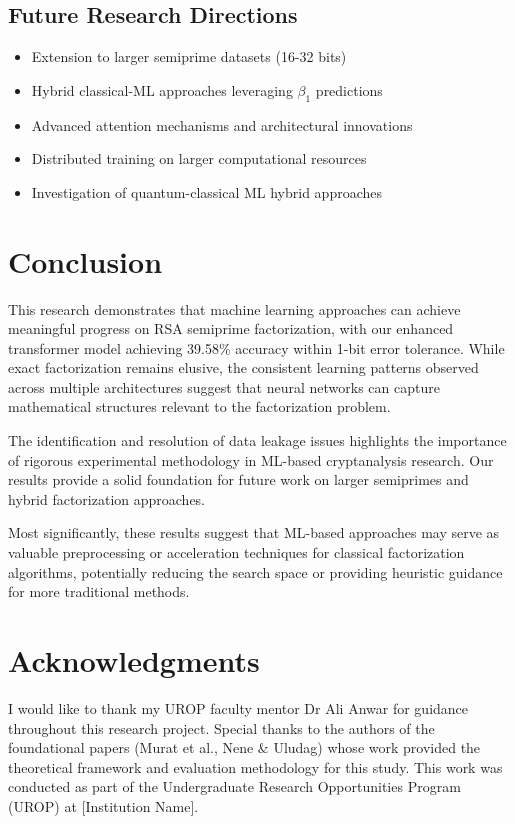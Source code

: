 \documentclass[12pt]{article}
\begin{document}
\subsection{Future Research Directions}
\begin{itemize}
\item Extension to larger semiprime datasets (16-32 bits)
\item Hybrid classical-ML approaches leveraging $\beta_1$ predictions
\item Advanced attention mechanisms and architectural innovations
\item Distributed training on larger computational resources
\item Investigation of quantum-classical ML hybrid approaches
\end{itemize}

\section{Conclusion}

This research demonstrates that machine learning approaches can achieve meaningful progress on RSA semiprime factorization, with our enhanced transformer model achieving 39.58\% accuracy within 1-bit error tolerance. While exact factorization remains elusive, the consistent learning patterns observed across multiple architectures suggest that neural networks can capture mathematical structures relevant to the factorization problem.

The identification and resolution of data leakage issues highlights the importance of rigorous experimental methodology in ML-based cryptanalysis research. Our results provide a solid foundation for future work on larger semiprimes and hybrid factorization approaches.

Most significantly, these results suggest that ML-based approaches may serve as valuable preprocessing or acceleration techniques for classical factorization algorithms, potentially reducing the search space or providing heuristic guidance for more traditional methods.

\section*{Acknowledgments}

I would like to thank my UROP faculty mentor Dr Ali Anwar for guidance throughout this research project. Special thanks to the authors of the foundational papers (Murat et al., Nene \& Uludag) whose work provided the theoretical framework and evaluation methodology for this study. This work was conducted as part of the Undergraduate Research Opportunities Program (UROP) at [Institution Name].
\end{document}
